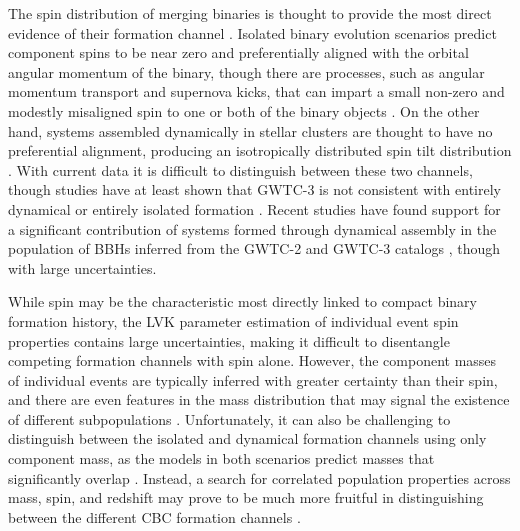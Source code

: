 The spin distribution of merging binaries is thought to provide the most direct evidence of their formation channel \citep{2017Natur.548..426F,2018ApJ...854L...9F}. Isolated binary evolution scenarios predict component spins to be near zero and preferentially aligned with the orbital angular momentum of the binary, though there are processes, such as angular momentum transport and supernova kicks, that can impart a small non-zero and modestly misaligned spin to one or both of the binary objects \citep{2203.02515, 1706.07053, 10.1051/0004-6361/201936204, 10.1051/0004-6361/202039804}. On the other hand, systems assembled dynamically in stellar clusters are thought to have no preferential alignment, producing an isotropically distributed spin tilt distribution \citep{10.3847/2041-8205/832/1/L2,10.1103/PhysRevD.100.043027}. With current data it is difficult to distinguish between these two channels, though studies have at least shown that GWTC-3 is not consistent with entirely dynamical or entirely isolated formation \citep{2021arXiv211103634T,2022ApJ...937L..13C,2022arXiv220902206T,2022arXiv221012834E,10.3847/2041-8213/ac86c4}. Recent studies have found support for a significant contribution of systems formed through dynamical assembly in the population of BBHs inferred from the GWTC-2 and GWTC-3 catalogs \citep{2021ApJ...913L...7A,2021PhRvD.104h3010R,2021arXiv211103634T,2022ApJ...937L..13C,2021ApJ...921L..15G,2022arXiv220902206T,2022arXiv220906978V,2022arXiv221012834E}, though with large uncertainties. 

While spin may be the characteristic most directly linked to compact binary formation history, the LVK parameter estimation of individual event spin properties contains large uncertainties, making it difficult to disentangle competing formation channels with spin alone. However, the component masses of individual events are typically inferred with greater certainty than their spin, and there are even features in the mass distribution that may signal the existence of different subpopulations \citep{2021ApJ...913L..19T,2022ApJ...924..101E,2021arXiv211103634T,2022ApJ...928..155T,2022arXiv221012834E}. Unfortunately, it can also be challenging to distinguish between the isolated and dynamical formation channels using only component mass, as the models in both scenarios predict masses that significantly overlap \citep{1609.05916}. Instead, a search for correlated population properties across mass, spin, and redshift may prove to be much more fruitful in distinguishing between the different CBC formation channels \citep{2021ApJ...912...98F,2021ApJ...922L...5C,2022ApJ...931...17V,2022ApJ...932L..19B}. 

